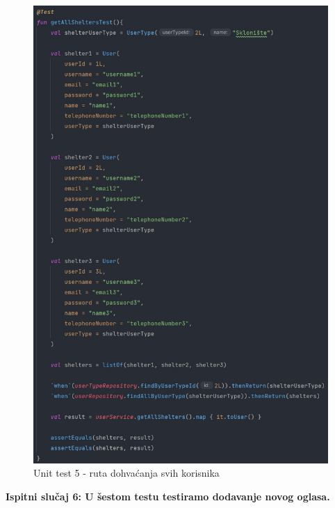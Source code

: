 		\begin{figure}[H]
			\includegraphics[scale=0.5]{slike/unit5.PNG} 
			\centering
			\caption{Unit test 5 - ruta dohvaćanja svih korisnika}
			\label{unit5}
		\end{figure}
		
\pagebreak
\textbf{Ispitni slučaj 6: U šestom testu testiramo dodavanje novog oglasa.}		
		
